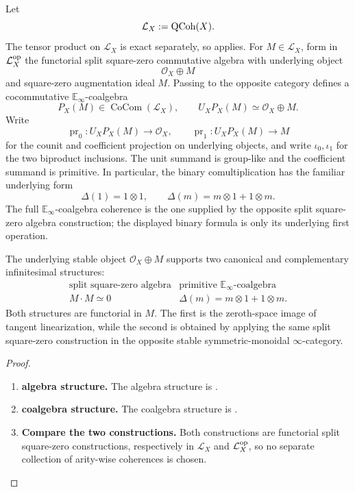 \begin{construction}
\label{con:primitive-infinitesimal-coalgebra}
Let
\[
    \mathcal L_X:=\operatorname{QCoh}(X).
\]
The tensor product on \(\mathcal L_X\) is exact separately, so
 applies. For
\(M\in\mathcal L_X\), form in \(\mathcal L_X^{\mathrm{op}}\) the functorial split
square-zero commutative algebra with underlying object
\[
    \mathcal O_X\oplus M
\]
and square-zero augmentation ideal \(M\). Passing to the opposite category
defines a cocommutative \(\mathbb E_\infty\)-coalgebra
\[
    P_X(M)\in\operatorname{CoCom}(\mathcal L_X),
    \qquad
    U_XP_X(M)\simeq\mathcal O_X\oplus M.
\]
Write
\[
    \operatorname{pr}_0:U_XP_X(M)\longrightarrow\mathcal O_X,
    \qquad
    \operatorname{pr}_1:U_XP_X(M)\longrightarrow M
\]
for the counit and coefficient projection on underlying objects, and write
\(\iota_0,\iota_1\) for the two biproduct inclusions. The unit summand is
group-like and the coefficient summand is primitive. In particular, the
binary comultiplication has the familiar underlying form
\[
    \Delta(1)=1\otimes1,
    \qquad
    \Delta(m)=m\otimes1+1\otimes m.
\]
The full \(\mathbb E_\infty\)-coalgebra coherence is the one supplied by the
opposite split square-zero algebra construction; the displayed binary formula
is only its underlying first operation.
\end{construction}

\begin{proposition}
\label{prop:square-zero-primitive-comparison}
The underlying stable object \(\mathcal O_X\oplus M\) supports two canonical
and complementary infinitesimal structures:
\[
\begin{array}{c|c}
\text{split square-zero algebra} & \text{primitive }\mathbb E_\infty\text{-coalgebra}
\\ \hline
M\cdot M\simeq0 &
\Delta(m)=m\otimes1+1\otimes m.
\end{array}
\]
Both structures are functorial in \(M\). The first is the zeroth-space image
of tangent linearization, while the second is obtained by applying the same
split square-zero construction in the opposite stable symmetric-monoidal
\(\infty\)-category.
\end{proposition}

\begin{proof}
\leavevmode
\begin{enumerate}[label=\textup{(\arabic*)}]
    \item \textbf{algebra structure.}
    The algebra structure is .

    \item \textbf{coalgebra structure.}
    The coalgebra structure is .

    \item \textbf{Compare the two constructions.}
    Both constructions are functorial split square-zero constructions, respectively in
    \(\mathcal L_X\) and \(\mathcal L_X^{\mathrm{op}}\), so no separate collection of arity-wise coherences is chosen.
\end{enumerate}
\end{proof}

